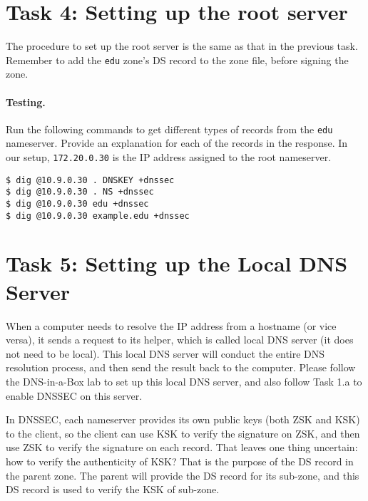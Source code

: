 \section{Task 4: Setting up the root server} 

The procedure to set up the root server is the same as that in the 
previous task. Remember to add the \texttt{edu} zone's DS record 
to the zone file, before signing the zone.  


\paragraph{Testing.}
Run the following commands to get different types of records
from the \texttt{edu} nameserver. Provide an explanation
for each of the records in the response. In our setup,
\texttt{172.20.0.30} is the 
IP address assigned to the root nameserver.


\begin{lstlisting}
$ dig @10.9.0.30 . DNSKEY +dnssec
$ dig @10.9.0.30 . NS +dnssec
$ dig @10.9.0.30 edu +dnssec
$ dig @10.9.0.30 example.edu +dnssec
\end{lstlisting}




\section{Task 5: Setting up the Local DNS Server} 


When a computer needs to resolve the IP address from a hostname (or vice versa),
it sends a request to its helper, which is called local DNS server (it
does not need to be local).  This local DNS server will conduct the
entire DNS resolution process, and then send the result back to the computer.
Please follow the DNS-in-a-Box lab to set up this local DNS server, and also
follow Task 1.a to enable DNSSEC on this server. 

In DNSSEC, each nameserver provides its own public keys (both ZSK and KSK) to
the client, so the client can use KSK to verify the signature on ZSK, and then use ZSK to 
verify the signature on each record. That leaves one thing uncertain: how to verify
the authenticity of KSK? That is the purpose of the DS record in the parent zone. 
The parent will provide the DS record for its sub-zone, and this DS record is used 
to verify the KSK of sub-zone. 

